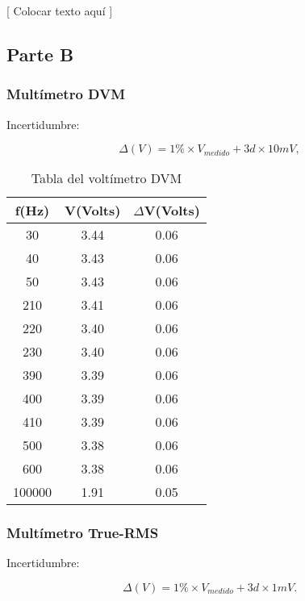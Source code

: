 \documentclass{article}
\begin{document}
	[ Colocar texto aquí ]




\subsection{Parte B}

\subsubsection{Multímetro DVM}

Incertidumbre:

\begin{equation}
 	\Delta(V) = 1\%\times V_{medido} + 3d\times 10mV,
\end{equation}
\medskip


\begin{table}[!hbt]
	\begin{center}
	\begin{tabular}{|c|c|c|}\hline
	\textbf{f(Hz)} & \textbf{V(Volts)} & \textbf{$\Delta$V(Volts)} \\ \hline

	30 & 3.44 &  0.06	\\ \hline
    40 & 3.43 &	0.06\\ \hline
    50 & 3.43 &	0.06\\ \hline
	210 & 3.41 & 0.06\\ \hline
	220 & 3.40 & 0.06\\ \hline
	230 & 3.40 & 0.06\\ \hline
	390 & 3.39 & 0.06\\ \hline
	400 & 3.39 & 0.06\\ \hline
	410 & 3.39 & 0.06\\	 \hline
	500 & 3.38 & 0.06\\ \hline
	600 & 3.38 & 0.06\\ \hline
	100000 & 1.91 &	0.05\\ \hline
	\end{tabular}
	\caption{Tabla del voltímetro DVM}
	\end{center}
\end{table}
\bigskip


\subsubsection{Multímetro True-RMS}

Incertidumbre:

\begin{equation}
 	\Delta(V) = 1\%\times V_{medido} + 3d\times 1mV.
\end{equation}
\medskip
\end{document}
